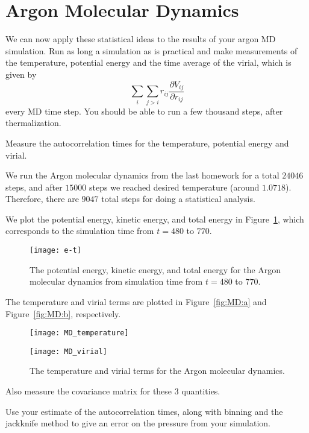 \section{Argon Molecular Dynamics}

We can now apply these statistical ideas to the results of your argon MD simulation. Run as
long a simulation as is practical and make measurements of the temperature, potential energy
and the time average of the virial, which is given by
%
\begin{equation}
    \sum_i \sum_{j > i} r_{ij} \frac{ \partial V_{ij} }{ \partial r_{ij} }
\end{equation}
%
every MD time step. You should be able to run a few thousand steps, after thermalization.


\Question{} Measure the autocorrelation times for the temperature, potential energy and
virial.

\Answer{}
We run the Argon molecular dynamics from the last homework for a total \(24046\) steps,
and after \(15000\) steps we reached desired temperature (around \(1.0718\)).
Therefore, there are \(9047\) total steps for doing a statistical analysis.

We plot the potential energy, kinetic energy, and total energy in Figure~\ref{fig:MD_e_t},
which corresponds to the simulation time from \(t = 480\) to \(770\).

\begin{figure}[hb]
    \centering
    \texttt{[image: e-t]}
    \caption{The potential energy, kinetic energy, and total energy for the
        Argon molecular dynamics from simulation time from \(t = 480\) to \(770\).}
    \label{fig:MD_e_t}
\end{figure}

The temperature and virial terms are plotted in
Figure~\ref{fig:MD:a} and Figure~\ref{fig:MD:b}, respectively.

\begin{figure}[H]
    \centering
    \begin{minipage}[t]{0.8\linewidth}
        \centering
        \texttt{[image: MD\_temperature]}
        \label{fig:MD:a}
    \end{minipage}
    \hfill
    \begin{minipage}[t]{0.8\linewidth}
        \centering
        \texttt{[image: MD\_virial]}
        \label{fig:MD:b}
    \end{minipage}
    \caption{The temperature and virial terms for the
        Argon molecular dynamics.}
    \label{fig:MD}
\end{figure}


\Question{} Also measure the covariance matrix for these \(3\) quantities.

\Answer{}



\Question{} Use your estimate of the autocorrelation times, along with binning and the
jackknife method to give an error on the pressure from your simulation.

\Answer{}

